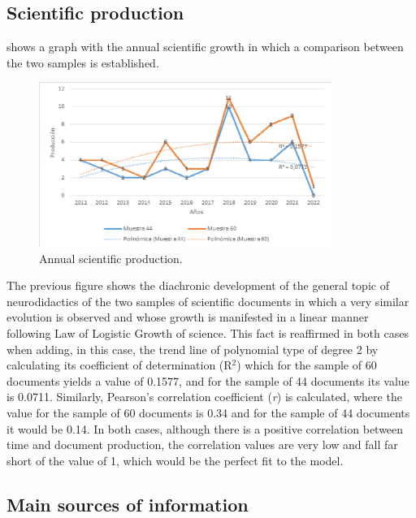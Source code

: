 \documentclass[english]{textolivre}
\begin{document}
\subsection{Scientific production}

 shows a graph with the annual scientific growth in which a comparison between the two samples is established.

\begin{figure}[h!]
 \centering
 \includegraphics[width=0.85\textwidth]{Fig1.png}
 \caption{Annual scientific production.}
 \label{fig01}
\end{figure}

The previous figure shows the diachronic development of the general topic of neurodidactics of the two samples of scientific documents in which a very similar evolution is observed and whose growth is manifested in a linear manner following  Law of Logistic Growth of science. This fact is reaffirmed in both cases when adding, in this case, the trend line of polynomial type of degree 2 by calculating its coefficient of determination (R${^2}$) which for the sample of 60 documents yields a value of 0.1577, and for the sample of 44 documents its value is 0.0711. Similarly, Pearson's correlation coefficient (\textit{r}) is calculated, where the value for the sample of 60 documents is 0.34 and for the sample of 44 documents it would be 0.14. In both cases, although there is a positive correlation between time and document production, the correlation values are very low and fall far short of the value of 1, which would be the perfect fit to the model.  

\subsection{Main sources of information}
\end{document}
